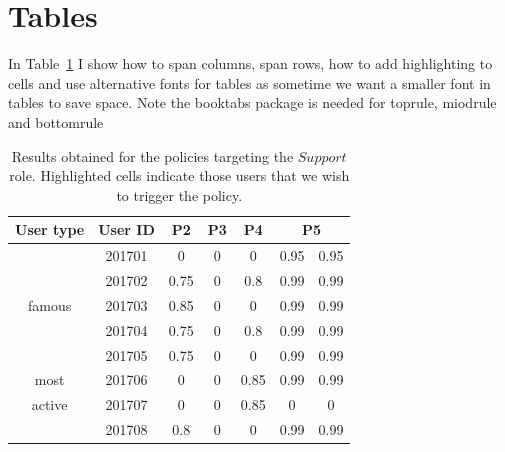 \documentclass{article}
\begin{document}
\section{Tables}

In Table~\ref{tab:results_supports} I show how to span columns, span rows, how to add highlighting to cells and use alternative fonts for tables as sometime we want a smaller font in tables to save space. Note the booktabs package is needed for toprule, miodrule and bottomrule
\begin{table}
	\sffamily
	\centering
	\caption[Results obtained for the policies targeting the $Support$ role]{Results obtained for the policies targeting the $Support$ role. Highlighted cells indicate those users that we wish to trigger the policy.} 
	\label{tab:results_supports}
	\begin{small}
		\begin{tabular}{ccccccc} \toprule
			
			\hspace*{-2mm}User type & User ID&P2 &P3 &P4  &\multicolumn{2}{c}{P5}   \\ 
			\hline
			& \hspace*{-2mm}201701	&0	&0	&0	&\cellcolor{yellow}0.95	&0.95 \\ 
			& \hspace*{-2mm}201702	&0.75	&0	&0.8	&\cellcolor{yellow}0.99	&\cellcolor{yellow}0.99\\ 
			\hspace*{-2mm}famous  & \hspace*{-2mm}201703	&\cellcolor{yellow}0.85	&0	&0	&\cellcolor{yellow}0.99	&\cellcolor{yellow}0.99\\ 
			& \hspace*{-2mm}201704	&0.75	&0	&0.8	&\cellcolor{yellow}0.99	&\cellcolor{yellow}0.99\\ 
			& \hspace*{-2mm}201705	&0.75	&0	&0	&\cellcolor{yellow}0.99	&\cellcolor{yellow}0.99\\ \midrule
			\hspace*{-2mm}most& \hspace*{-2mm}201706	&0	&0	&\cellcolor{yellow}0.85	&\cellcolor{yellow}0.99	&\cellcolor{yellow}0.99\\ 
			\hspace*{-2mm}active& \hspace*{-2mm}201707	&0	&0	&\cellcolor{yellow}0.85	&0	&0\\ 
			& \hspace*{-2mm}201708	&\cellcolor{yellow}0.8	&0	&0	&\cellcolor{yellow}0.99	&\cellcolor{yellow}0.99\\  \bottomrule

		\end{tabular}
	\end{small}
	
	\vspace*{-4mm}
\end{table}
\end{document}

